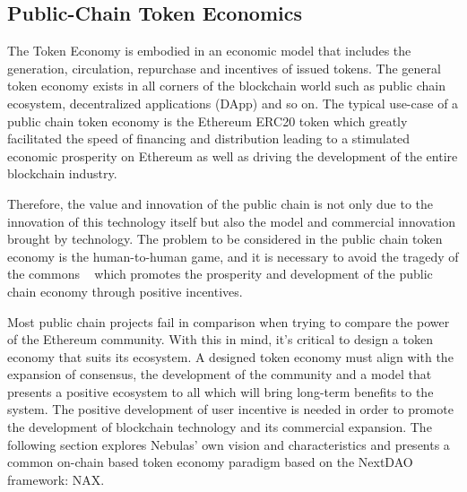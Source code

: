 \subsection{Public-Chain Token Economics}
The Token Economy is embodied in an economic model that includes the generation, circulation, repurchase and incentives of issued tokens.  The general token economy exists in all corners of the blockchain world such as public chain ecosystem, decentralized applications (DApp) and so on. The typical use-case of a public chain token economy is the Ethereum ERC20 token which greatly facilitated the speed of financing and distribution leading to a stimulated economic prosperity on Ethereum as well as driving the development of the entire blockchain industry. 

Therefore, the value and innovation of the public chain is not only due to the innovation of this technology itself but also the model and commercial innovation brought by technology. The problem to be considered in the public chain token economy is the human-to-human game, and it is necessary to avoid the tragedy of the commons ~\cite{TragedyOfTheCommons} which promotes the prosperity and development of the public chain economy through positive incentives.

Most public chain projects fail in comparison when trying to compare the power of the Ethereum community. With this in mind, it's critical to design a token economy that suits its ecosystem. A designed token economy must align with the expansion of consensus, the development of the community and a model that presents a positive ecosystem to all which will bring long-term benefits to the system. The positive development of user incentive is needed in order to promote the development of blockchain technology and its commercial expansion. The following section explores Nebulas' own vision and characteristics and presents a common on-chain based token economy paradigm based on the NextDAO framework: NAX.
